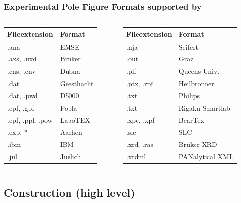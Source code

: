 \begin{frame}[fragile]
  \frametitle{Experimental Pole Figure Formats supported by \MTEX}

  \begin{columns}

    \begin{column}{5cm}
      \begin{tabular}{ll}
        Fileextension & Format \\
        \toprule
        .ana & EMSE \\
        .axs, .uxd & Bruker  \\
        .cns, .cnv & Dubna\\
        .dat & Geesthacht \\
        .dat, .pwd & D5000\\
        .epf, .gpf &	Popla \\
        .epf, .ppf, .pow &	LaboTEX \\
        .exp, * & Aachen \\
        .ibm & IBM \\
        .jul & Juelich
      \end{tabular}
    \end{column}
    \begin{column}{5cm}
      \begin{tabular}{ll}
        Fileextension & Format \\
        \toprule
        .nja & Seifert\\
        .out & Graz \\
        .plf & Queens Univ. \\
        .ptx, .rpf & Heilbronner \\
        .txt & Philips \\
        .txt & Rigaku Smartlab \\
        .xpe, .xpf & BearTex \\
        .slc & SLC \\
        .xrd, .ras & Bruker XRD \\
        .xrdml & PANalytical XML \\
      \end{tabular}
    \end{column}
  \end{columns}
\end{frame}

\subsection*{Construction (high level)}

